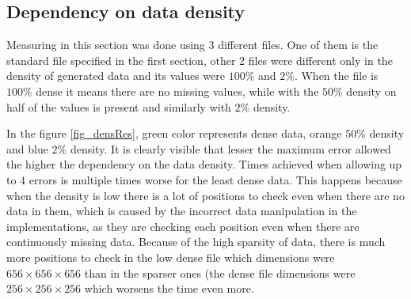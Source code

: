 \subsection{Dependency on data density}
Measuring in this section was done using 3 different files. One of them is the standard file specified in the first section, other 2 files were different only in the density of generated data and its values were $100 \%$ and $2 \%$. When the file is $100 \%$ dense it means there are no missing values, while with the $50 \%$ density on half of the values is present and similarly with $2 \%$ density.

In the figure \ref{fig_densRes}, green color represents dense data, orange $50 \%$ density and blue $2 \%$ density. It is clearly visible that lesser the maximum error allowed the higher the dependency on the data density. Times achieved when allowing up to 4 errors is multiple times worse for the least dense data. This happens because when the density is low there is a lot of positions to check even when there are no data in them, which is caused by the incorrect data manipulation in the implementations, as they are checking each position even when there are continuously missing data. Because of the high sparsity of data, there is much more positions to check in the low dense file which dimensions were $656\times 656 \times 656$ than in the sparser ones (the dense file dimensions were $256\times 256 \times 256$ which worsens the time even more.

